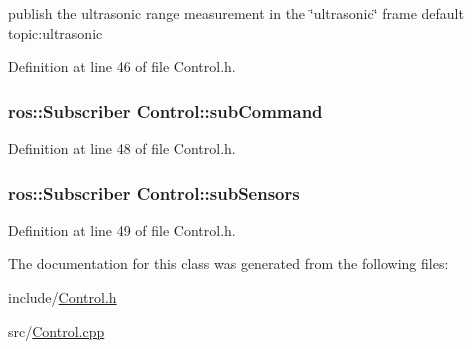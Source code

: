 publish the ultrasonic range measurement in the \char`\"{}ultrasonic\char`\"{} frame default topic\-:ultrasonic 



Definition at line 46 of file Control.\-h.

\hypertarget{classControl_a497d6d472f41ae3e087e8d7ea4c79e7c}{
\subsubsection[{sub\-Command}]{\setlength{\rightskip}{0pt plus 5cm}ros\-::\-Subscriber Control\-::sub\-Command\hspace{0.3cm}{\ttfamily [private]}}}\label{classControl_a497d6d472f41ae3e087e8d7ea4c79e7c}


Definition at line 48 of file Control.\-h.

\hypertarget{classControl_af489d55663df41604322747fe6209c17}{
\subsubsection[{sub\-Sensors}]{\setlength{\rightskip}{0pt plus 5cm}ros\-::\-Subscriber Control\-::sub\-Sensors\hspace{0.3cm}{\ttfamily [private]}}}\label{classControl_af489d55663df41604322747fe6209c17}


Definition at line 49 of file Control.\-h.



The documentation for this class was generated from the following files\-:\begin{DoxyCompactItemize}
\item 
include/\hyperlink{Control_8h}{Control.\-h}\item 
src/\hyperlink{Control_8cpp}{Control.\-cpp}\end{DoxyCompactItemize}
